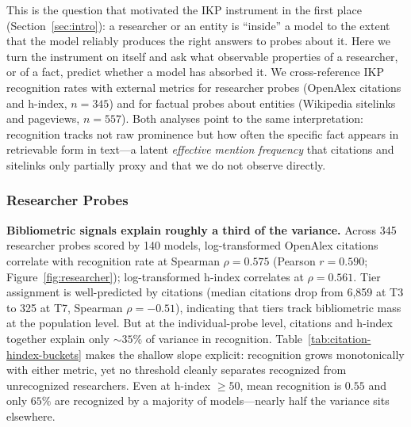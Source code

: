 \documentclass[11pt]{article}
\begin{document}
This is the question that motivated the IKP instrument in the first place (Section~\ref{sec:intro}): a researcher or an entity is ``inside'' a model to the extent that the model reliably produces the right answers to probes about it. Here we turn the instrument on itself and ask what observable properties of a researcher, or of a fact, predict whether a model has absorbed it. We cross-reference IKP recognition rates with external metrics for researcher probes (OpenAlex citations and h-index, $n = 345$) and for factual probes about entities (Wikipedia sitelinks and pageviews, $n = 557$). Both analyses point to the same interpretation: recognition tracks not raw prominence but how often the specific fact appears in retrievable form in text---a latent \emph{effective mention frequency} that citations and sitelinks only partially proxy and that we do not observe directly.

\subsubsection{Researcher Probes}
\label{sec:recognition-researchers}

\textbf{Bibliometric signals explain roughly a third of the variance.} Across 345 researcher probes scored by 140 models, log-transformed OpenAlex citations correlate with recognition rate at Spearman $\rho = 0.575$ (Pearson $r = 0.590$; Figure~\ref{fig:researcher}); log-transformed h-index correlates at $\rho = 0.561$. Tier assignment is well-predicted by citations (median citations drop from 6{,}859 at T3 to 325 at T7, Spearman $\rho = -0.51$), indicating that tiers track bibliometric mass at the population level. But at the individual-probe level, citations and h-index together explain only ${\sim}35\%$ of variance in recognition. Table~\ref{tab:citation-hindex-buckets} makes the shallow slope explicit: recognition grows monotonically with either metric, yet no threshold cleanly separates recognized from unrecognized researchers. Even at h-index $\geq 50$, mean recognition is $0.55$ and only $65\%$ are recognized by a majority of models---nearly half the variance sits elsewhere.
\end{document}
